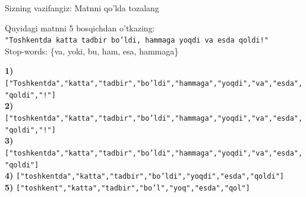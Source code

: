 \documentclass[aspectratio=169,11pt]{beamer}
\begin{document}
\begin{frame}{Sizning vazifangiz: Matnni qo'lda tozalang}
  \begin{tcolorbox}[warnbox,title=Savol --- 2 daqiqa]
    \small
    Quyidagi matnni 5 bosqichdan o'tkazing:\\[4pt]
    \texttt{"Toshkentda katta tadbir bo'ldi, hammaga yoqdi va esda qoldi!"}\\[4pt]
    Stop-words: \{va, yoki, bu, ham, esa, hammaga\}
  \end{tcolorbox}
  \pause
  \begin{tcolorbox}[okbox,title=Javob]
    \footnotesize
    \textbf{1)} \texttt{["Toshkentda","katta","tadbir","bo'ldi","hammaga","yoqdi","va","esda","qoldi","!"]}\\[2pt]
    \textbf{2)} \texttt{["toshkentda","katta","tadbir","bo'ldi","hammaga","yoqdi","va","esda","qoldi","!"]}\\[2pt]
    \textbf{3)} \texttt{["toshkentda","katta","tadbir","bo'ldi","hammaga","yoqdi","va","esda","qoldi"]}\\[2pt]
    \textbf{4)} \texttt{["toshkentda","katta","tadbir","bo'ldi","yoqdi","esda","qoldi"]}\\[2pt]
    \textbf{5)} \texttt{["toshkent","katta","tadbir","bo'l","yoq","esda","qol"]}
  \end{tcolorbox}
\end{frame}
\end{document}
